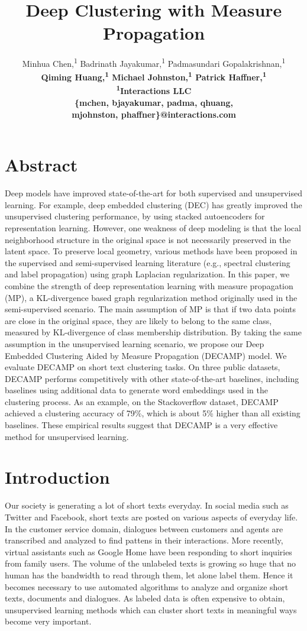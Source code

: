 \documentclass[letterpaper]{article}
\title{Deep Clustering with Measure Propagation}
\author{
Minhua Chen,\textsuperscript{\rm 1}
Badrinath Jayakumar,\textsuperscript{\rm 1} 
Padmasundari Gopalakrishnan,\textsuperscript{\rm 1}\\
\bf \Large Qiming Huang,\textsuperscript{\rm 1}
Michael Johnston,\textsuperscript{\rm 1}
Patrick Haffner,\textsuperscript{\rm 1}\\
\textsuperscript{\rm 1}Interactions LLC \\
\{mchen, bjayakumar, padma,
qhuang, \\
mjohnston, phaffner\}@interactions.com
}
\begin{document}
\maketitle
\setcounter{tocdepth}{1}


\section{Abstract}
Deep models have improved state-of-the-art for both supervised and unsupervised learning. For example, deep embedded clustering (DEC) has greatly improved the unsupervised clustering performance, by using stacked autoencoders for representation learning. However, one weakness of deep modeling is that the local neighborhood structure in the original space is not necessarily preserved in the latent space. To preserve local geometry, various methods have been proposed in the supervised and semi-supervised learning literature (e.g., spectral clustering and label propagation) using graph Laplacian regularization. In this paper, we combine the strength of deep representation learning with measure propagation (MP), a KL-divergence based graph regularization method originally used in the semi-supervised scenario. The main assumption of MP is that if two data points are close in the original space, they are likely to belong to the same class, measured by KL-divergence of class membership distribution. By taking the same assumption in the unsupervised learning scenario, we propose our Deep Embedded Clustering Aided by Measure Propagation (DECAMP) model. We evaluate DECAMP on short text clustering tasks. On three public datasets, DECAMP performs competitively with other state-of-the-art baselines, including baselines using additional data to generate word embeddings used in the clustering process. As an example, on the Stackoverflow dataset, DECAMP achieved a clustering accuracy of 79\%, which is about 5\% higher than all existing baselines. These empirical results suggest that DECAMP is a very effective method for unsupervised learning.


\section{Introduction}
Our society is generating a lot of short texts everyday. In social media such as Twitter and Facebook, short texts are posted on various aspects of everyday life. In the customer service domain, dialogues between customers and agents are transcribed and analyzed to find pattens in their interactions. More recently, virtual assistants such as Google Home have been responding to short inquiries from family users. The volume of the unlabeled texts is growing so huge that no human has the bandwidth to read through them, let alone label them. Hence it becomes necessary to use automated algorithms to analyze and organize short texts, documents and dialogues. As labeled data is often expensive to obtain, unsupervised learning methods which can cluster short texts in meaningful ways become very important.
\end{document}
